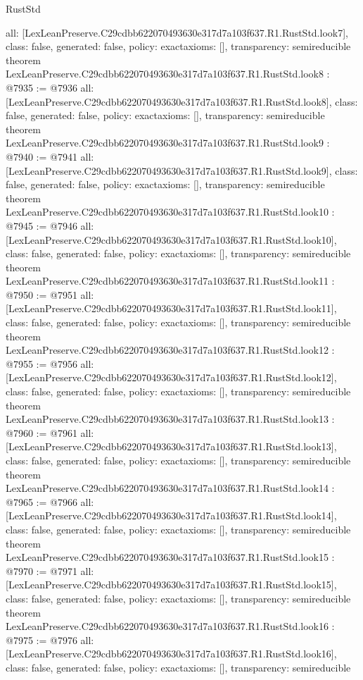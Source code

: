 \begin{lexlean}{RustStd}
\begin{coremodule}
{  all: [LexLeanPreserve.C29cdbb622070493630e317d7a103f637.R1.RustStd.look7],
  class: false,
  generated: false,
  policy: exact{axioms: []},
  transparency: semireducible
}
theorem LexLeanPreserve.C29cdbb622070493630e317d7a103f637.R1.RustStd.look8 : @7935 := @7936 {
  all: [LexLeanPreserve.C29cdbb622070493630e317d7a103f637.R1.RustStd.look8],
  class: false,
  generated: false,
  policy: exact{axioms: []},
  transparency: semireducible
}
theorem LexLeanPreserve.C29cdbb622070493630e317d7a103f637.R1.RustStd.look9 : @7940 := @7941 {
  all: [LexLeanPreserve.C29cdbb622070493630e317d7a103f637.R1.RustStd.look9],
  class: false,
  generated: false,
  policy: exact{axioms: []},
  transparency: semireducible
}
theorem LexLeanPreserve.C29cdbb622070493630e317d7a103f637.R1.RustStd.look10 : @7945 := @7946 {
  all: [LexLeanPreserve.C29cdbb622070493630e317d7a103f637.R1.RustStd.look10],
  class: false,
  generated: false,
  policy: exact{axioms: []},
  transparency: semireducible
}
theorem LexLeanPreserve.C29cdbb622070493630e317d7a103f637.R1.RustStd.look11 : @7950 := @7951 {
  all: [LexLeanPreserve.C29cdbb622070493630e317d7a103f637.R1.RustStd.look11],
  class: false,
  generated: false,
  policy: exact{axioms: []},
  transparency: semireducible
}
theorem LexLeanPreserve.C29cdbb622070493630e317d7a103f637.R1.RustStd.look12 : @7955 := @7956 {
  all: [LexLeanPreserve.C29cdbb622070493630e317d7a103f637.R1.RustStd.look12],
  class: false,
  generated: false,
  policy: exact{axioms: []},
  transparency: semireducible
}
theorem LexLeanPreserve.C29cdbb622070493630e317d7a103f637.R1.RustStd.look13 : @7960 := @7961 {
  all: [LexLeanPreserve.C29cdbb622070493630e317d7a103f637.R1.RustStd.look13],
  class: false,
  generated: false,
  policy: exact{axioms: []},
  transparency: semireducible
}
theorem LexLeanPreserve.C29cdbb622070493630e317d7a103f637.R1.RustStd.look14 : @7965 := @7966 {
  all: [LexLeanPreserve.C29cdbb622070493630e317d7a103f637.R1.RustStd.look14],
  class: false,
  generated: false,
  policy: exact{axioms: []},
  transparency: semireducible
}
theorem LexLeanPreserve.C29cdbb622070493630e317d7a103f637.R1.RustStd.look15 : @7970 := @7971 {
  all: [LexLeanPreserve.C29cdbb622070493630e317d7a103f637.R1.RustStd.look15],
  class: false,
  generated: false,
  policy: exact{axioms: []},
  transparency: semireducible
}
theorem LexLeanPreserve.C29cdbb622070493630e317d7a103f637.R1.RustStd.look16 : @7975 := @7976 {
  all: [LexLeanPreserve.C29cdbb622070493630e317d7a103f637.R1.RustStd.look16],
  class: false,
  generated: false,
  policy: exact{axioms: []},
  transparency: semireducible
}

\end{coremodule}
\end{lexlean}
